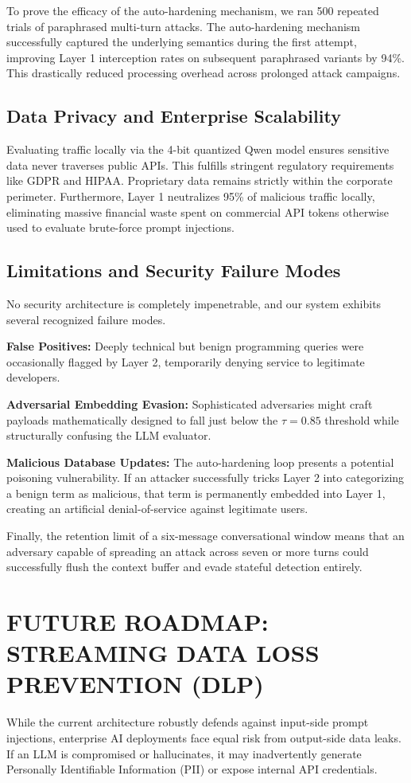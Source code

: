 \documentclass[10pt, conference]{IEEEtran}
\begin{document}
To prove the efficacy of the auto-hardening mechanism, we ran 500 repeated trials of paraphrased multi-turn attacks. The auto-hardening mechanism successfully captured the underlying semantics during the first attempt, improving Layer 1 interception rates on subsequent paraphrased variants by 94\%. This drastically reduced processing overhead across prolonged attack campaigns.

\subsection{Data Privacy and Enterprise Scalability}
Evaluating traffic locally via the 4-bit quantized Qwen model ensures sensitive data never traverses public APIs. This fulfills stringent regulatory requirements like GDPR and HIPAA. Proprietary data remains strictly within the corporate perimeter. Furthermore, Layer 1 neutralizes 95\% of malicious traffic locally, eliminating massive financial waste spent on commercial API tokens otherwise used to evaluate brute-force prompt injections.

\subsection{Limitations and Security Failure Modes}
No security architecture is completely impenetrable, and our system exhibits several recognized failure modes. 

\textbf{False Positives:} Deeply technical but benign programming queries were occasionally flagged by Layer 2, temporarily denying service to legitimate developers. 

\textbf{Adversarial Embedding Evasion:} Sophisticated adversaries might craft payloads mathematically designed to fall just below the $\tau=0.85$ threshold while structurally confusing the LLM evaluator. 

\textbf{Malicious Database Updates:} The auto-hardening loop presents a potential poisoning vulnerability. If an attacker successfully tricks Layer 2 into categorizing a benign term as malicious, that term is permanently embedded into Layer 1, creating an artificial denial-of-service against legitimate users. 

Finally, the retention limit of a six-message conversational window means that an adversary capable of spreading an attack across seven or more turns could successfully flush the context buffer and evade stateful detection entirely.

\section{FUTURE ROADMAP: STREAMING DATA LOSS PREVENTION (DLP)}
While the current architecture robustly defends against input-side prompt injections, enterprise AI deployments face equal risk from output-side data leaks. If an LLM is compromised or hallucinates, it may inadvertently generate Personally Identifiable Information (PII) or expose internal API credentials. 
\end{document}
